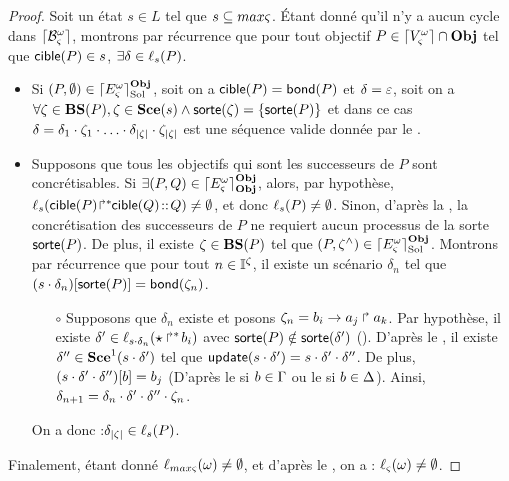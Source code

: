 \begin{proof}
  Soit un état $s \in L$ tel que $s \subseteq max\varsigma$.
  Étant donné qu'il n'y a aucun cycle dans $\lceil \mathcal{B}_\varsigma^\omega\rceil$, montrons par récurrence que
  pour tout objectif $P \in \lceil V_\varsigma^\omega\rceil \cap \mathbf{Obj}$ tel que $\mathsf{cible}(P) \in s$,
  $\exists \delta \in \ell_s(P)$.
  \begin{itemize}
    \item Si $(P, \emptyset) \in \lceil E_\varsigma^\omega\rceil^{\mathbf{Obj}}_{\mathrm{Sol}}$,
      soit on a $\mathsf{cible}(P) = \mathsf{bond}(P)$ et $\delta = \varepsilon$,
      soit on a $\forall \zeta \in \mathbf{BS}(P), \zeta \in \mathbf{Sce}(s) \wedge \mathsf{sorte}(\zeta) = \{ \mathsf{sorte}(P) \}$
      et dans ce cas $\delta = \delta_1 \PHplay \zeta_1 \PHplay \dots \PHplay
        \delta_{|\zeta|} \PHplay \zeta_{|\zeta|}$
      est une séquence valide donnée par le .
    \item Supposons que tous les objectifs qui sont les successeurs de $P$ sont concrétisables.
      Si $\exists (P, Q) \in \lceil E_\varsigma^\omega\rceil^{\mathbf{Obj}}_{\mathbf{Obj}}$, alors, par hypothèse,
        $\ell_{s}({\mathsf{cible}(P)\!\Rsh^*\!\!\mathsf{cible}(Q)} \!::\! Q) \neq \emptyset$, et donc
        $\ell_{s}(P) \neq \emptyset$.
      Sinon, d'après la , la concrétisation des successeurs de $P$ ne requiert
        aucun processus de la sorte $\mathsf{sorte}(P)$.
        De plus, il existe $\zeta \in \mathbf{BS}(P)$ tel que $(P, \zeta^\wedge) \in \lceil E_\varsigma^\omega\rceil^{\mathbf{Obj}}_{\mathrm{Sol}}$.
        Montrons par récurrence que pour tout $n \in \mathbb{I}^{\zeta}$, il existe un scénario
        $\delta_n$ tel que ${(s \cdot \delta_n)[\mathsf{sorte}(P)]} = \mathsf{bond}(\zeta_n)$.
        \begin{itemize} %
          \item[$\circ$] Supposons que $\delta_n$ existe et posons $\zeta_n = b_i\rightarrow a_j\Rsh a_k$.
            Par hypothèse, il existe $\delta' \in \ell_{s \cdot \delta_n}(\mbox{$\star\Rsh^*\!b_i$})$
            avec $\mathsf{sorte}(P) \notin \mathsf{sorte}(\delta')$ ().
            D'après le , il existe
            $\delta'' \in \mathbf{Sce}^1(s \cdot \delta')$ tel que
            $\mathsf{update}(s \cdot \delta') = s \cdot \delta' \cdot \delta''$.
            De plus, ${(s \cdot \delta' \cdot \delta'')[b]} = b_j$
            (D'après le  si $b \in \Gamma$
            ou le  si $b \in \Delta$).
            Ainsi, $\delta_{n+1} = \delta_n \cdot \delta' \cdot \delta'' \cdot \zeta_n$.
        \end{itemize}
      On a donc :$\delta_{|\zeta|} \in \ell_s(P)$. %
  \end{itemize}
  Finalement, étant donné $\ell_{max\varsigma}(\omega) \neq \emptyset$,
  et d'après le ,
  on a : $\ell_\varsigma(\omega) \neq \emptyset$.
\end{proof}



